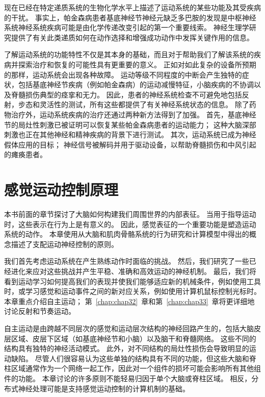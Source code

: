 现在已经在特定递质系统的生物化学水平上描述了运动系统的某些功能及其受疾病的干扰。
事实上，帕金森病患者基底神经节神经元缺乏多巴胺的发现是中枢神经系统神经系统疾病可能是由化学传递改变引起的第一个重要线索。
神经生理学研究提供了有关此类递质如何在动作选择和增强成功动作中发挥关键作用的信息。


了解运动系统的功能特性不仅是其本身的基础，而且对于帮助我们了解该系统的疾病并探索治疗和恢复的可能性具有更重要的意义。
正如对如此复杂的设备所预期的那样，运动系统会出现各种故障。
运动等级不同程度的中断会产生独特的症状，包括基底神经节疾病（例如帕金森病）的运动减慢特征，小脑疾病的不协调以及脊髓损伤典型的痉挛和无力。
因此，患者的神经系统检查不可避免地包括反射，步态和灵活性的测试，所有这些都提供了有关神经系统状态的信息。
除了药物治疗外，运动系统疾病的治疗还通过两种新方法得到了加强。
首先，基底神经节的局灶性刺激已被证明可以恢复某些帕金森病患者的运动能力；
这种大脑深部刺激也正在其他神经和精神疾病的背景下进行测试。
其次，运动系统已成为神经假体应用的目标；
神经信号被解码并用于驱动设备，以帮助脊髓损伤和中风引起的瘫痪患者。




\chapter{感觉运动控制原理} \label{chap:chap30}

本书前面的章节探讨了大脑如何构建我们周围世界的内部表征。
当用于指导运动时，这些表示在行为上是有意义的。
因此，感觉表征的一个重要功能是塑造运动系统的动作。 
本章使用从大脑和肌肉骨骼系统的行为研究和计算模型中得出的概念描述了支配运动神经控制的原则。


我们首先考虑运动系统在产生熟练动作时面临的挑战。
然后，我们研究了一些已经进化来应对这些挑战并产生平稳、准确和高效运动的神经机制。
最后，我们将看到运动学习如何提高我们的表现并使我们能够适应新的机械条件，例如使用工具时，或学习感觉和运动事件之间的新对应关系，例如使用计算机鼠标控制光标时。
本章重点介绍自主运动；
第~\ref{chap:chap32}~章和第~\ref{chap:chap33}~章将更详细地讨论反射和节奏运动。


自主运动是由跨越不同层次的感觉和运动层次结构的神经回路产生的，包括大脑皮层区域、皮层下区域（如基底神经节和小脑）以及脑干和脊髓网络。
这些不同的结构具有独特的神经活动模式。
此外，对不同结构的局灶性损伤会导致明显的运动缺陷。 
尽管人们很容易认为这些单独的结构具有不同的功能，但这些大脑和脊柱区域通常作为一个网络一起工作，因此对一个组件的损坏可能会影响所有其他组件的功能。
本章讨论的许多原则不能轻易归因于单个大脑或脊柱区域。
相反，分布式神经处理可能是支持感觉运动控制的计算机制的基础。



